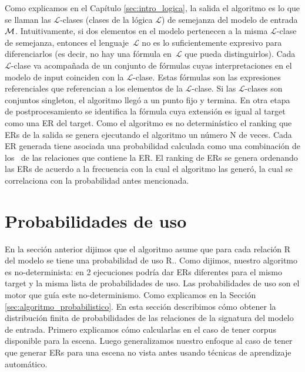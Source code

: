 Como explicamos en el Cap\'itulo \ref{sec:intro_logica}, la salida el algoritmo es lo que se llaman las $\mathcal {L}$-clases (clases de la l\'ogica $\mathcal {L}$) de semejanza del modelo de entrada $\mathcal{M} $. Intuitivamente, si dos elementos en el modelo pertenecen a la misma $\mathcal {L}$-clase de semejanza, entonces el lenguaje~$\mathcal {L}$ no es lo suficientemente expresivo para diferenciarlos (es decir, no hay una f\'ormula en~$\mathcal {L }$ que pueda distinguirlos). Cada  $\mathcal {L}$-clase va acompa\~nada de un conjunto de f\'ormulas cuyas interpretaciones en el modelo de input coinciden con la $\mathcal {L}$-clase. Estas f\'ormulas son las expresiones referenciales que referencian a los elementos de la $\mathcal {L}$-clase. Si las $\mathcal {L}$-clases son conjuntos singleton, el algoritmo lleg\'o a un punto fijo y termina. En otra etapa de postprocesamiento se identifica la f\'ormula cuya extensi\'on es igual al target como una ER del target. Como el algoritmo es no determin\'istico el ranking que ERs de la salida se genera ejecutando el algoritmo un n\'umero N de veces. Cada ER generada tiene asociada una probabilidad calculada como una combinaci\'on de los \puse\ de las relaciones que contiene la ER. El ranking de ERs se genera ordenando las ERs de acuerdo a la frecuencia con la cual el algoritmo las gener\'o, la cual se correlaciona con la probabilidad antes mencionada.


\section{Probabilidades de uso}
\label{sec:learning}

En la secci\'on anterior dijimos que el algoritmo asume que para cada relaci\'on R del modelo se tiene una probabilidad de uso R.\puse. Como dijimos, nuestro algoritmo es no-determinista: en 2 ejecuciones podr\'ia dar ERs diferentes para el mismo target y la misma lista de probabilidades de uso. Las probabilidades de uso son el motor que gu\'ia este no-determinismo. Como explicamos en la Secci\'on \ref{sec:algoritmo_probabilistico}. En esta secci\'on describimos c\'omo obtener la distribuci\'on finita de probabilidades de las relaciones de la signatura del modelo de entrada. Primero explicamos c\'omo calcularlas en el caso de tener corpus disponible para la escena. Luego generalizamos nuestro enfoque al caso de tener que generar ERs para una escena no vista antes usando t\'ecnicas de aprendizaje autom\'atico.  

